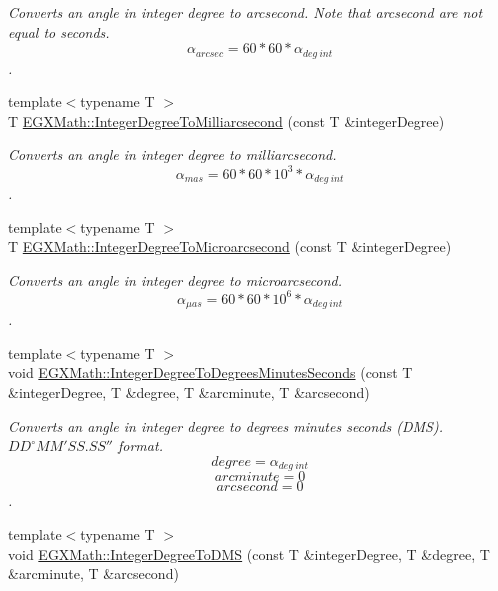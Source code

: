 \begin{DoxyCompactItemize}
\begin{DoxyCompactList}\small\item\em Converts an angle in integer degree to arcsecond. Note that arcsecond are not equal to seconds. \[\alpha_{arcsec}=60 * 60 * \alpha_{deg\ int}\]. \end{DoxyCompactList}\item 
{\footnotesize template$<$typename T $>$ }\\T \mbox{\hyperlink{group___e_g_x_math-_angle_conversions-_integer_degree_gadc43f22e832cd8fcf16b7bd2269ae348}{E\+G\+X\+Math\+::\+Integer\+Degree\+To\+Milliarcsecond}} (const T \&integer\+Degree)
\begin{DoxyCompactList}\small\item\em Converts an angle in integer degree to milliarcsecond. \[\alpha_{mas}=60 * 60 * 10^3 * \alpha_{deg\ int} \]. \end{DoxyCompactList}\item 
{\footnotesize template$<$typename T $>$ }\\T \mbox{\hyperlink{group___e_g_x_math-_angle_conversions-_integer_degree_ga69179d6082764595c7014805e1f6b31e}{E\+G\+X\+Math\+::\+Integer\+Degree\+To\+Microarcsecond}} (const T \&integer\+Degree)
\begin{DoxyCompactList}\small\item\em Converts an angle in integer degree to microarcsecond. \[\alpha_{\mu as}=60 * 60 * 10^6 * \alpha_{deg\ int}\]. \end{DoxyCompactList}\item 
{\footnotesize template$<$typename T $>$ }\\void \mbox{\hyperlink{group___e_g_x_math-_angle_conversions-_integer_degree_ga204317877546ea6bbafe5ff558f55a16}{E\+G\+X\+Math\+::\+Integer\+Degree\+To\+Degrees\+Minutes\+Seconds}} (const T \&integer\+Degree, T \&degree, T \&arcminute, T \&arcsecond)
\begin{DoxyCompactList}\small\item\em Converts an angle in integer degree to degrees minutes seconds (D\+MS). ${DD}^{\circ}{MM}'{SS.SS}''$ format. \[degree=\alpha_{deg\ int}\] \[arcminute= 0\] \[arcsecond= 0\]. \end{DoxyCompactList}\item 
{\footnotesize template$<$typename T $>$ }\\void \mbox{\hyperlink{group___e_g_x_math-_angle_conversions-_integer_degree_gaf76779bcc23268b41d4c3a7610d60eaf}{E\+G\+X\+Math\+::\+Integer\+Degree\+To\+D\+MS}} (const T \&integer\+Degree, T \&degree, T \&arcminute, T \&arcsecond)

\end{DoxyCompactItemize}
